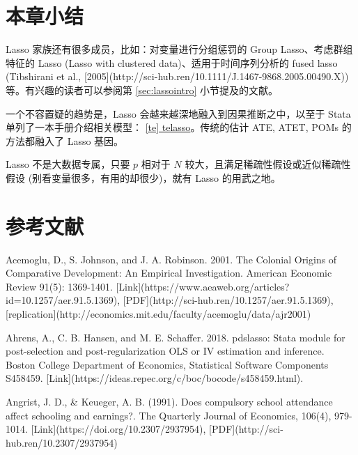 {\section{本章小结}

Lasso 家族还有很多成员，比如：对变量进行分组惩罚的 Group Lasso、考虑群组特征的 Lasso (Lasso with clustered data)、适用于时间序列分析的 fused lasso (Tibshirani et al., [2005](http://sci-hub.ren/10.1111/J.1467-9868.2005.00490.X)) 等。有兴趣的读者可以参阅第 \ref{sec:lassointro} 小节提及的文献。

一个不容置疑的趋势是，Lasso 会越来越深地融入到因果推断之中，以至于 Stata 单列了一本手册介绍相关模型： \href{https://www.stata.com/manuals/tetelasso.pdf}{[te] telasso}。传统的估计 ATE, ATET, POMs 的方法都融入了 Lasso 基因。

Lasso 不是大数据专属，只要 $p$ 相对于 $N$ 较大，且满足稀疏性假设或近似稀疏性假设 (别看变量很多，有用的却很少)，就有  Lasso  的用武之地。




%
%




\section{参考文献}


Acemoglu, D., S. Johnson, and J. A. Robinson. 2001. The Colonial Origins of Comparative Development: An Empirical Investigation. American Economic Review 91(5): 1369-1401. [Link](https://www.aeaweb.org/articles?id=10.1257/aer.91.5.1369),  [PDF](http://sci-hub.ren/10.1257/aer.91.5.1369), [replication](http://economics.mit.edu/faculty/acemoglu/data/ajr2001)

Ahrens, A., C. B. Hansen, and M. E. Schaffer. 2018. pdslasso: Stata module for post-selection and post-regularization
OLS or IV estimation and inference. Boston College Department of Economics, Statistical Software Components
S458459. [Link](https://ideas.repec.org/c/boc/bocode/s458459.html).

Angrist, J. D., \& Keueger, A. B. (1991). Does compulsory school attendance affect schooling and earnings?. The Quarterly Journal of Economics, 106(4), 979-1014. [Link](https://doi.org/10.2307/2937954), [PDF](http://sci-hub.ren/10.2307/2937954)

}
